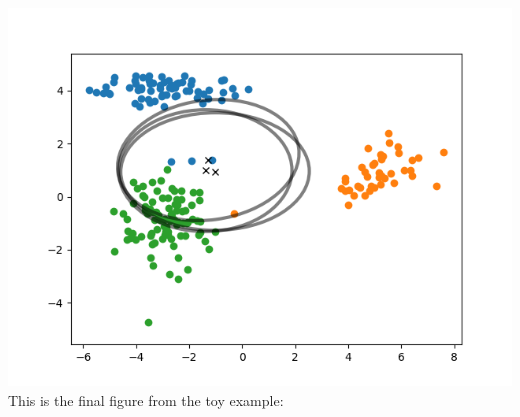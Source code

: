\documentclass[11pt]{article}
\begin{document}
\begin{enumerate}[1.]
		\includegraphics[width=6in]{toy_beginning.png}\\
		
		This is the final figure from the toy example:
		

\end{enumerate}
\end{document}
